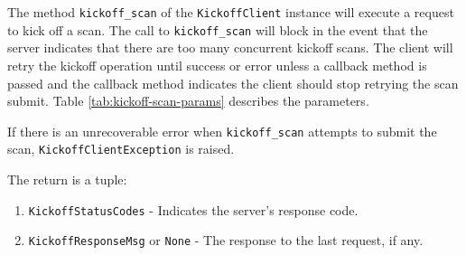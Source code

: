 The method \texttt{kickoff\_scan} of the \texttt{KickoffClient} instance will execute a request to kick off a scan.  The
call to \texttt{kickoff\_scan} will block in the event that the server indicates that there are too many concurrent
kickoff scans.  The client will retry the kickoff operation until success or error unless a callback method is passed
and the callback method indicates the client should stop retrying the scan submit. Table \ref{tab:kickoff-scan-params}
describes the parameters.

If there is an unrecoverable error when \texttt{kickoff\_scan} attempts to submit the scan, \texttt{KickoffClientException}
is raised.

The return is a tuple:

\begin{enumerate}
  \item \texttt{KickoffStatusCodes} - Indicates the server's response code.
  \item \texttt{KickoffResponseMsg} or \texttt{None} - The response to the last request, if any.
\end{enumerate}


